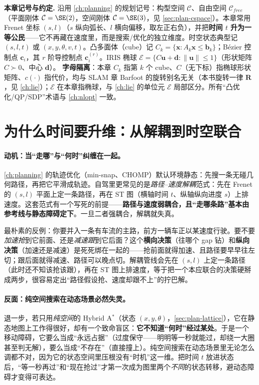 \begin{note}
\textbf{本章记号与约定.}\;
沿用 \cref{ch:planning} 的规划记号：构型空间 $\mathcal{C}$、自由空间 $\mathcal{C}_{free}$（平面刚体 $\mathcal{C}=\SE(2)$，空间刚体 $\mathcal{C}=\SE(3)$，见 \cref{sec:plan-cspace}）。本章常用 Frenet 坐标 $(s,l)$（$s$ 纵向弧长、$l$ 横向偏移，取左正右负），并把\textbf{时间 $t$ 升为一等公民}——它不再藏在速度里，而是搜索/优化的独立维度。时空状态典型记 $(s,l,t)$ 或 $(x,y,\theta,v,t)$。凸多面体（cube）记 $C_k=\{\mathbf{x}:A_k\mathbf{x}\le\mathbf{b}_k\}$；Bézier 控制点 $\mathbf{c}_i$，其 $r$ 阶导控制点 $\mathbf{c}_i^{(r)}$。IRIS 椭球 $\mathcal{E}=\{C\mathbf{u}+\mathbf{d}:\|\mathbf{u}\|\le1\}$（形状矩阵 $C\succ0$、中心 $\mathbf{d}$）。
\textbf{字母隔离}：本章 $C_k$ 指第 $k$ 个 cube、$C$（无下标）指椭球形状矩阵、$c(\cdot)$ 指代价，均与 SLAM 章 Barfoot 的旋转别名无关（本书旋转一律 $\mathbf{R}$，见 \cref{ch:lie}）；$\mathcal{E}$ 在本章指椭球，与 \cref{ch:lie} 的单位元 $\mathcal{E}$ 局部区分。所有“凸优化/QP/SDP”术语与 \cref{ch:nlopt} 一致。
\end{note}

\section{为什么时间要升维：从解耦到时空联合}
\label{sec:stc-spatiotemporal}

\paragraph{动机：当“走哪”与“何时”纠缠在一起。}
\cref{ch:planning} 的轨迹优化（min-snap、CHOMP）默认环境静态：先搜一条无碰几何路径，再把它平滑成轨迹。自驾里更常见的是\emph{路径--速度解耦}范式\cite{ding2019ssc}：先在 Frenet 的 $(s,l)$ 平面上定一条路径，再在 ST 图（横轴时间 $t$、纵轴纵向进度 $s$）上排速度。这套范式有一个写死的前提——\textbf{路径与速度弱耦合，且“走哪条路”基本由参考线与静态障碍定下}。一旦二者强耦合，解耦就失真。

最朴素的反例：你要并入一条有车流的主路，前方一辆车正以某速度行驶。要不要\emph{加速抢}到它前面、还是\emph{减速跟}到它后面？这个\textbf{横向决策}（往哪个 gap 钻）和\textbf{纵向决策}（加速还是减速）是死死绑在一起的——抢前面就得加速、且路径要早早往左切；跟后面就得减速、路径可以晚点切。解耦管线会先在 $(s,l)$ 上定一条路径（此时还不知该抢该跟），再在 ST 图上排速度，等于把一个本应联合的决策硬掰成两步，很容易定出“路径假设抢、速度却跟不上”的拧巴解。

\paragraph{反面：纯空间搜索在动态场景必然失灵。}
退一步，若只用\emph{纯空间}的 Hybrid A$^*$（状态 $(x,y,\theta)$，\cref{sec:plan-lattice}），它在静态地图上工作得很好，却有一个致命盲区：\textbf{它不知道“何时”经过某处}。于是一个移动障碍，它要么当成“永远占据”（过度保守——明明等一秒就能过，却绕一大圈甚至判无解），要么当成“不存在”（直接撞上）。纯空间搜索在动态场景里无论怎么调都不对，因为它的状态空间里压根没有“时机”这一维。把时间 $t$ 放进状态后，“等一秒再过”和“现在抢过”才第一次成为图里两个\emph{不同}的状态转移，避动态障碍才变得可表达。

